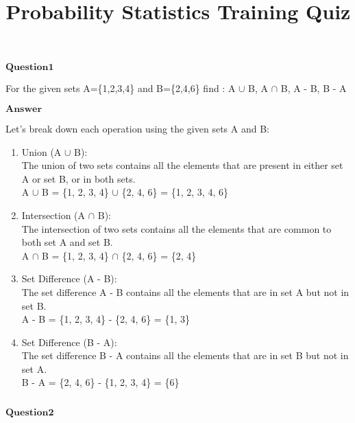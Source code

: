 \documentclass[11pt]{article}
\title{Probability Statistics Training Quiz}
\makeatletter
\newcommand{\boxspacing}{\kern\kvtcb@left@rule\kern\kvtcb@boxsep}
\newcommand{\prompt}[4]{
        {\ttfamily\llap{{\color{#2}[#3]:\hspace{3pt}#4}}\vspace{-\baselineskip}}
    }
\makeatother
\begin{document}
    
    \maketitle
    
    

    
    $\textbf{Question1}$

For the given sets A=\{1,2,3,4\} and B=\{2,4,6\} find : A $\cup$ B, A $\cap$ B, A - B, B - A

$\textbf{Answer}$

    Let's break down each operation using the given sets A and B:

\begin{enumerate}
\def\labelenumi{\arabic{enumi}.}
\item
  Union (A $\cup$ B):\\
  The union of two sets contains all the elements that are present in
  either set A or set B, or in both sets.\\
  A $\cup$ B = \{1, 2, 3, 4\} $\cup$ \{2, 4, 6\} = \{1, 2, 3, 4, 6\}
\item
  Intersection (A $\cap$ B):\\
  The intersection of two sets contains all the elements that are common
  to both set A and set B.\\
  A $\cap$ B = \{1, 2, 3, 4\} $\cap$ \{2, 4, 6\} = \{2, 4\}
\item
  Set Difference (A - B):\\
  The set difference A - B contains all the elements that are in set A
  but not in set B.\\
  A - B = \{1, 2, 3, 4\} - \{2, 4, 6\} = \{1, 3\}
\item
  Set Difference (B - A):\\
  The set difference B - A contains all the elements that are in set B
  but not in set A.\\
  B - A = \{2, 4, 6\} - \{1, 2, 3, 4\} = \{6\}
\end{enumerate}

    \begin{tcolorbox}[breakable, size=fbox, boxrule=1pt, pad at break*=1mm,colback=cellbackground, colframe=cellborder]
\prompt{In}{incolor}{ }{\boxspacing}
\begin{Verbatim}[commandchars=\\\{\}]

\end{Verbatim}
\end{tcolorbox}

    $\textbf{Question2}$
\end{document}
